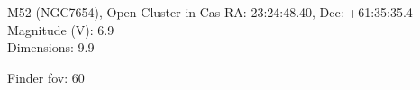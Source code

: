 \begin{block}{M52 (NGC7654), Open Cluster in Cas}
    RA: 23:24:48.40, Dec: +61:35:35.4 \\ 
    Magnitude (V): 6.9 \\ 
    Dimensions: 9.9 

    Finder fov: 60 
\end{block}